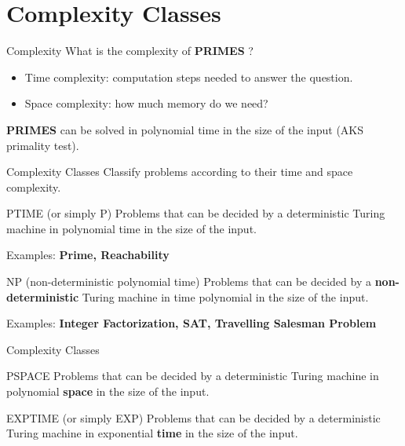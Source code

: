 \documentclass[c]{beamer}
\begin{document}
\section{Complexity Classes}
\begin{frame}{Complexity}
      What is the complexity of \textbf{PRIMES} ?
	 \begin{itemize}
			\item Time complexity: computation steps needed to answer the question.
			\item Space complexity: how much memory do we need?
	 \end{itemize}
	 
	 \textbf{PRIMES} can be solved in polynomial time in the size of the input (AKS primality test).
	 
\end{frame}

\begin{frame}{Complexity Classes}
    Classify problems according to their time and space complexity.
	\begin{block}{PTIME (or simply P)}
		Problems that can be decided by a deterministic Turing machine in polynomial time in the size of the input.
    \end{block}
    Examples: \textbf{Prime, Reachability}
    \begin{block}{NP (non-deterministic polynomial time)}
		Problems that can be decided by a \textbf{non-deterministic} Turing machine in time polynomial in the size of the input.
    \end{block}
    Examples: \textbf{Integer Factorization, SAT, Travelling Salesman Problem}
\end{frame}

\begin{frame}{Complexity Classes}
    \begin{block}{PSPACE}
		Problems that can be decided by a deterministic Turing machine in polynomial \textbf{space} in the size of the input.
    \end{block}
    \begin{block}{EXPTIME (or simply EXP)}
		Problems that can be decided by a deterministic Turing machine in exponential \textbf{time} in the size of the input.
    \end{block}
\end{frame}
\end{document}
